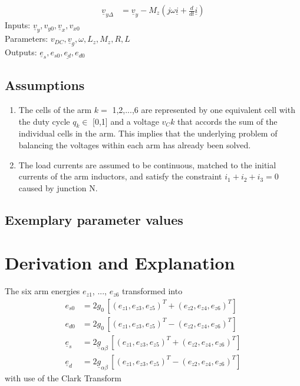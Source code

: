 \documentclass[10pt,a4paper]{article}
\begin{document}
	\begin{align}
		\underline{v}_{y\Delta} &= \underline{v}_y - M_z (j\omega \underline{i} + \frac{d}{dt}\underline{i})
	\end{align}
	Inputs: $\underline{v}_y,v_{y0},\underline{v}_x,v_{x0}$ 
	\\
	Parameters: $v_{DC},\underline{v}_g,\omega,L_z,M_z,R,L$
	\\
	Outputs: $\underline{e}_s,e_{s0},\underline{e_d},e_{d0}$
	
	
	\subsection{Assumptions}	
	\begin{enumerate}
		\item The cells of the arm $k=$ 1,2,...,6 are represented by one equivalent cell with the duty cycle $q_k \in$ [0,1] and a voltage $v_Ck$ that accords the sum of the individual cells in the arm. This implies that the
		underlying problem of balancing the voltages within each
		arm has already been solved.
		\item The load currents are assumed to be continuous, matched
		to the initial currents of the arm inductors, and satisfy the
		constraint $i_1 + i_2 + i_3 = 0$ caused by junction N.
	\end{enumerate}
	
	
	\subsection{Exemplary parameter values}
	

			
	\section{Derivation and Explanation} 
	The six arm energies $e_{z1}$, ..., $e_{z6}$ transformed into  
	\begin{subequations}	
	\begin{align}
		e_{s0} &= 2g_0 \, [(e_{z1},e_{z3},e_{z5})^T+(e_{z2},e_{z4},e_{z6})^T] 	\\
		e_{d0} &=2g_0 \, [(e_{z1},e_{z3},e_{z5})^T-(e_{z2},e_{z4},e_{z6})^T]	\\
		\underline{e}_s &=2\underline{g}_{\alpha\beta} \, [(e_{z1},e_{z3},e_{z5})^T+(e_{z2},e_{z4},e_{z6})^T]	\\
		\underline{e}_d &=2\underline{g}_{\alpha\beta} \, [(e_{z1},e_{z3},e_{z5})^T-(e_{z2},e_{z4},e_{z6})^T]
	\end{align}	
	\end{subequations}
	with use of the Clark Transform
	
\end{document}
